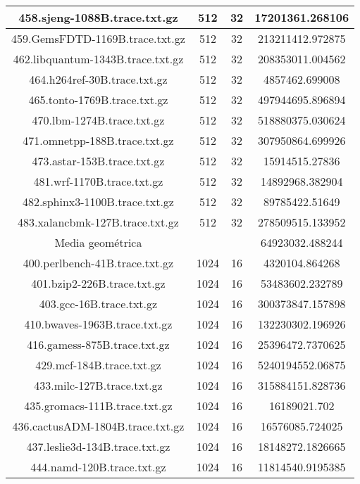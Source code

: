 \begin{table}[H]
\begin{center}
{\begin{tabular}{|c|c|c|c|}
		\hline
		458.sjeng-1088B.trace.txt.gz	&	512	&	32	&	17201361.268106	\\
		\hline
		459.GemsFDTD-1169B.trace.txt.gz	&	512	&	32	&	213211412.972875	\\
		\hline
		462.libquantum-1343B.trace.txt.gz	&	512	&	32	&	208353011.004562	\\
		\hline
		464.h264ref-30B.trace.txt.gz	&	512	&	32	&	4857462.699008	\\
		\hline
		465.tonto-1769B.trace.txt.gz	&	512	&	32	&	497944695.896894	\\
		\hline
		470.lbm-1274B.trace.txt.gz	&	512	&	32	&	518880375.030624	\\
		\hline
		471.omnetpp-188B.trace.txt.gz	&	512	&	32	&	307950864.699926	\\
		\hline
		473.astar-153B.trace.txt.gz	&	512	&	32	&	15914515.27836	\\
		\hline
		481.wrf-1170B.trace.txt.gz	&	512	&	32	&	14892968.382904	\\
		\hline
		482.sphinx3-1100B.trace.txt.gz	&	512	&	32	&	89785422.51649	\\
		\hline
		483.xalancbmk-127B.trace.txt.gz	&	512	&	32	&	278509515.133952	\\
		\hline
		\hline
		Media geométrica	&	&		&	64923032.488244	\\
		\hline
		400.perlbench-41B.trace.txt.gz	&	1024	&	16	&	4320104.864268	\\
		\hline
		401.bzip2-226B.trace.txt.gz	&	1024	&	16	&	53483602.232789	\\
		\hline
		403.gcc-16B.trace.txt.gz	&	1024	&	16	&	300373847.157898	\\
		\hline
		410.bwaves-1963B.trace.txt.gz	&	1024	&	16	&	132230302.196926	\\
		\hline
		416.gamess-875B.trace.txt.gz	&	1024	&	16	&	25396472.7370625	\\
		\hline
		429.mcf-184B.trace.txt.gz	&	1024	&	16	&	5240194552.06875	\\
		\hline
		433.milc-127B.trace.txt.gz	&	1024	&	16	&	315884151.828736	\\
		\hline
		435.gromacs-111B.trace.txt.gz	&	1024	&	16	&	16189021.702	\\
		\hline
		436.cactusADM-1804B.trace.txt.gz	&	1024	&	16	&	16576085.724025	\\
		\hline
		437.leslie3d-134B.trace.txt.gz	&	1024	&	16	&	18148272.1826665	\\
		\hline
		444.namd-120B.trace.txt.gz	&	1024	&	16	&	11814540.9195385	\\
		\hline

\end{tabular}}
\end{center}
\end{table}
